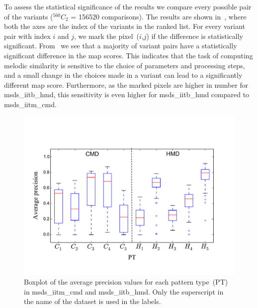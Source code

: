 To assess the statistical significance of the results we compare every possible pair of the variants ($^{560}C_{2}$ = 156520 comparisons). The results are shown in~, where both the axes are the index of the variants in the ranked list. For every variant pair with index $i$ and $j$, we mark the pixel~($i$,$j$) if the difference is statistically significant. From~ we see that a majority of variant pairs have a statistically significant difference in the \gls{map} scores. This indicates that the task of computing melodic similarity is sensitive to the choice of parameters and processing steps, and a small change in the choices made in a variant can lead to a significantly different \gls{map} score. Furthermore, as the marked pixels are higher in number for \acrshort{msds_iitb_hmd}, this sensitivity is even higher for \acrshort{msds_iitb_hmd} compared to \acrshort{msds_iitm_cmd}.


\begin{figure}
	\begin{center}
		\includegraphics[width=\figSizeEightyFive]{ch06_patterns/figures/SimilarityEvaluation/CMD_HMD_CW_MAP.pdf}
	\end{center}
	\caption{Boxplot of the average precision values for each pattern type~(PT) in \acrshort{msds_iitm_cmd} and \acrshort{msds_iitb_hmd}. Only the superscript in the name of the dataset is used in the labels.}
	\label{fig:patterns_similarity_evaluation_results_boxplot}
\end{figure}


